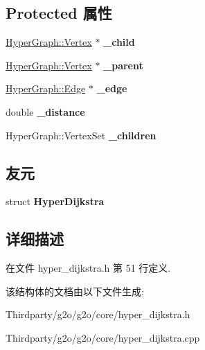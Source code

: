 \subsection*{Protected 属性}
\begin{DoxyCompactItemize}
\item 
\hypertarget{structg2o_1_1HyperDijkstra_1_1AdjacencyMapEntry_a7ccdf917414efa537c3942d360ca127a}{\hyperlink{classg2o_1_1HyperGraph_1_1Vertex}{Hyper\-Graph\-::\-Vertex} $\ast$ {\bfseries \-\_\-child}}\label{structg2o_1_1HyperDijkstra_1_1AdjacencyMapEntry_a7ccdf917414efa537c3942d360ca127a}

\item 
\hypertarget{structg2o_1_1HyperDijkstra_1_1AdjacencyMapEntry_a3490ab9668c98d3e0cb14c54b9d41747}{\hyperlink{classg2o_1_1HyperGraph_1_1Vertex}{Hyper\-Graph\-::\-Vertex} $\ast$ {\bfseries \-\_\-parent}}\label{structg2o_1_1HyperDijkstra_1_1AdjacencyMapEntry_a3490ab9668c98d3e0cb14c54b9d41747}

\item 
\hypertarget{structg2o_1_1HyperDijkstra_1_1AdjacencyMapEntry_adc56c13a328aac02456474a9e7c72415}{\hyperlink{classg2o_1_1HyperGraph_1_1Edge}{Hyper\-Graph\-::\-Edge} $\ast$ {\bfseries \-\_\-edge}}\label{structg2o_1_1HyperDijkstra_1_1AdjacencyMapEntry_adc56c13a328aac02456474a9e7c72415}

\item 
\hypertarget{structg2o_1_1HyperDijkstra_1_1AdjacencyMapEntry_a95b3db28f32badcdce2edf1bae83b78d}{double {\bfseries \-\_\-distance}}\label{structg2o_1_1HyperDijkstra_1_1AdjacencyMapEntry_a95b3db28f32badcdce2edf1bae83b78d}

\item 
\hypertarget{structg2o_1_1HyperDijkstra_1_1AdjacencyMapEntry_a5b69ff3769d50a3229e2df80cac3f093}{Hyper\-Graph\-::\-Vertex\-Set {\bfseries \-\_\-children}}\label{structg2o_1_1HyperDijkstra_1_1AdjacencyMapEntry_a5b69ff3769d50a3229e2df80cac3f093}

\end{DoxyCompactItemize}
\subsection*{友元}
\begin{DoxyCompactItemize}
\item 
\hypertarget{structg2o_1_1HyperDijkstra_1_1AdjacencyMapEntry_a358d802df25b35f34e715710d1fa380c}{struct {\bfseries Hyper\-Dijkstra}}\label{structg2o_1_1HyperDijkstra_1_1AdjacencyMapEntry_a358d802df25b35f34e715710d1fa380c}

\end{DoxyCompactItemize}


\subsection{详细描述}


在文件 hyper\-\_\-dijkstra.\-h 第 51 行定义.



该结构体的文档由以下文件生成\-:\begin{DoxyCompactItemize}
\item 
Thirdparty/g2o/g2o/core/hyper\-\_\-dijkstra.\-h\item 
Thirdparty/g2o/g2o/core/hyper\-\_\-dijkstra.\-cpp\end{DoxyCompactItemize}
